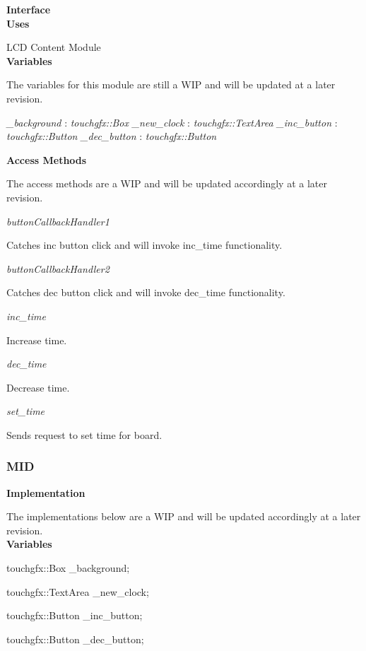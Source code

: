 \documentclass[12pt,titlepage]{article}
\begin{document}
\noindent \textbf{Interface} \\

\noindent \textbf{Uses}

\noindent LCD Content Module \\

\noindent \textbf{Variables}

\noindent The variables for this module are still a WIP and will be updated at a later revision. \newline

\noindent \textit{\_background} : \textit{touchgfx::Box} \newline
\noindent \textit{\_new\_clock} : \textit{touchgfx::TextArea} \newline
\noindent \textit{\_inc\_button} : \textit{touchgfx::Button} \newline
\noindent \textit{\_dec\_button} : \textit{touchgfx::Button} \newline

\noindent \textbf{Access Methods}

\noindent The access methods are a WIP and will be updated accordingly at a later revision. \par

\textit{buttonCallbackHandler1} \par
Catches inc button click and will invoke inc\_time functionality.

\textit{buttonCallbackHandler2} \par
Catches dec button click and will invoke dec\_time functionality.

\textit{inc\_time} \par
Increase time.

\textit{dec\_time} \par
Decrease time.

\textit{set\_time} \par
Sends request to set time for board.

\subsubsection*{MID}

\noindent \textbf{Implementation} 

\noindent The implementations below are a WIP and will be updated accordingly at a later revision.\\

\noindent \textbf{Variables}

touchgfx::Box \_background; \par
touchgfx::TextArea \_new\_clock; \par
touchgfx::Button \_inc\_button; \par
touchgfx::Button \_dec\_button; \newline
\end{document}
